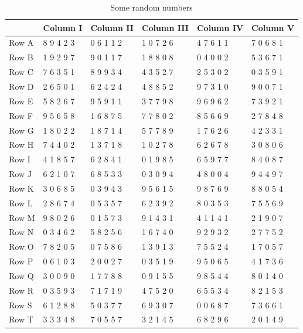 \documentclass[
  11pt,
  a4paper,
  krantz2]{krantz}
\begin{document}
\begin{table}
\centering
\caption{\label{tab:unnamed-chunk-7}Some random numbers}
\centering
\fontsize{9}{11}\selectfont
\begin{tabular}[t]{llllll}
\toprule
\textbf{ } & \textbf{Column I} & \textbf{Column II} & \textbf{Column III} & \textbf{Column IV} & \textbf{Column V}\\
\midrule
Row A & 8 9 4 2 3 & 0 6 1 1 2 & 1 0 7 2 6 & 4 7 6 1 1 & 7 0 6 8 1\\
Row B & 1 9 2 9 7 & 9 0 1 1 7 & 1 8 8 0 8 & 0 4 0 0 2 & 5 3 6 7 1\\
Row C & 7 6 3 5 1 & 8 9 9 3 4 & 4 3 5 2 7 & 2 5 3 0 2 & 0 3 5 9 1\\
Row D & 2 6 5 0 1 & 6 2 4 2 4 & 4 8 8 5 2 & 9 7 3 1 0 & 9 0 0 7 1\\
Row E & 5 8 2 6 7 & 9 5 9 1 1 & 3 7 7 9 8 & 9 6 9 6 2 & 7 3 9 2 1\\
\addlinespace
Row F & 9 5 6 5 8 & 1 6 8 7 5 & 7 7 8 0 2 & 8 5 6 6 9 & 2 7 8 4 8\\
Row G & 1 8 0 2 2 & 1 8 7 1 4 & 5 7 7 8 9 & 1 7 6 2 6 & 4 2 3 3 1\\
Row H & 7 4 4 0 2 & 1 3 7 1 8 & 1 0 2 7 8 & 6 2 6 7 8 & 3 0 8 0 6\\
Row I & 4 1 8 5 7 & 6 2 8 4 1 & 0 1 9 8 5 & 6 5 9 7 7 & 8 4 0 8 7\\
Row J & 6 2 1 0 7 & 6 8 5 3 3 & 0 3 0 9 4 & 4 8 0 0 4 & 9 4 4 9 7\\
\addlinespace
Row K & 3 0 6 8 5 & 0 3 9 4 3 & 9 5 6 1 5 & 9 8 7 6 9 & 8 8 0 5 4\\
Row L & 2 8 6 7 4 & 0 5 3 5 7 & 6 2 3 9 2 & 8 0 3 5 3 & 7 5 5 6 9\\
Row M & 9 8 0 2 6 & 0 1 5 7 3 & 9 1 4 3 1 & 4 1 1 4 1 & 2 1 9 0 7\\
Row N & 0 3 4 6 2 & 5 8 2 5 6 & 1 6 7 4 0 & 9 2 9 3 2 & 2 7 7 5 2\\
Row O & 7 8 2 0 5 & 0 7 5 8 6 & 1 3 9 1 3 & 7 5 5 2 4 & 1 7 0 5 7\\
\addlinespace
Row P & 0 6 1 0 3 & 2 0 0 2 7 & 0 3 5 1 9 & 9 5 0 6 5 & 4 1 7 3 6\\
Row Q & 3 0 0 9 0 & 1 7 7 8 8 & 0 9 1 5 5 & 9 8 5 4 4 & 8 0 1 4 0\\
Row R & 0 3 5 9 3 & 7 1 7 1 9 & 4 7 5 2 0 & 6 5 5 3 4 & 8 2 1 5 3\\
Row S & 6 1 2 8 8 & 5 0 3 7 7 & 6 9 3 0 7 & 0 0 6 8 7 & 7 3 6 6 1\\
Row T & 3 3 3 4 8 & 7 0 5 5 7 & 3 2 1 4 5 & 6 8 2 9 6 & 2 0 1 4 9\\

\end{tabular}
\end{table}
\end{document}

